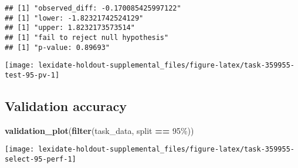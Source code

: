 \documentclass[
]{book}
\newenvironment{Shaded}{\begin{snugshade}}{\end{snugshade}}
\newcommand{\AttributeTok}[1]{\textcolor[rgb]{0.13,0.29,0.53}{#1}}
\newcommand{\DecValTok}[1]{\textcolor[rgb]{0.00,0.00,0.81}{#1}}
\newcommand{\FunctionTok}[1]{\textcolor[rgb]{0.13,0.29,0.53}{\textbf{#1}}}
\newcommand{\NormalTok}[1]{#1}
\newcommand{\OtherTok}[1]{\textcolor[rgb]{0.56,0.35,0.01}{#1}}
\newcommand{\SpecialCharTok}[1]{\textcolor[rgb]{0.81,0.36,0.00}{\textbf{#1}}}
\newcommand{\StringTok}[1]{\textcolor[rgb]{0.31,0.60,0.02}{#1}}
\begin{document}
\begin{Shaded}
\end{Shaded}

\begin{verbatim}
## [1] "observed_diff: -0.170085425997122"
## [1] "lower: -1.82321742524129"
## [1] "upper: 1.8232173573514"
## [1] "fail to reject null hypothesis"
## [1] "p-value: 0.89693"
\end{verbatim}

\texttt{[image: lexidate-holdout-supplemental\_files/figure-latex/task-359955-test-95-pv-1]}

\hypertarget{validation-accuracy-14}{%
\subsection{Validation accuracy}\label{validation-accuracy-14}}

\begin{Shaded}
\begin{Highlighting}[]
\FunctionTok{validation\_plot}\NormalTok{(}\FunctionTok{filter}\NormalTok{(task\_data, split }\SpecialCharTok{==} \StringTok{\textquotesingle{}95\%\textquotesingle{}}\NormalTok{))}
\end{Highlighting}
\end{Shaded}

\texttt{[image: lexidate-holdout-supplemental\_files/figure-latex/task-359955-select-95-perf-1]}
\end{document}
